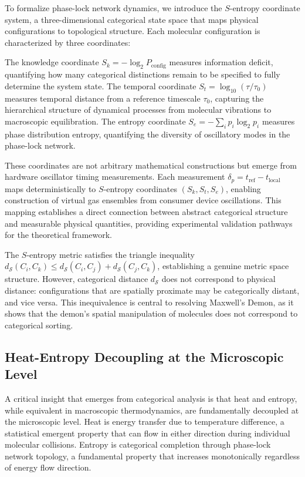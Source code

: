 \documentclass[12pt,a4paper]{article}
\theoremstyle{definition}
\theoremstyle{remark}
\begin{document}
To formalize phase-lock network dynamics, we introduce the $S$-entropy coordinate system, a three-dimensional categorical state space that maps physical configurations to topological structure. Each molecular configuration is characterized by three coordinates:

The knowledge coordinate $S_k = -\log_2 P_{\text{config}}$ measures information deficit, quantifying how many categorical distinctions remain to be specified to fully determine the system state. The temporal coordinate $S_t = \log_{10}(\tau/\tau_0)$ measures temporal distance from a reference timescale $\tau_0$, capturing the hierarchical structure of dynamical processes from molecular vibrations to macroscopic equilibration. The entropy coordinate $S_e = -\sum_i p_i \log_2 p_i$ measures phase distribution entropy, quantifying the diversity of oscillatory modes in the phase-lock network.

These coordinates are not arbitrary mathematical constructions but emerge from hardware oscillator timing measurements. Each measurement $\delta_p = t_{\text{ref}} - t_{\text{local}}$ maps deterministically to $S$-entropy coordinates $(S_k, S_t, S_e)$, enabling construction of virtual gas ensembles from consumer device oscillations. This mapping establishes a direct connection between abstract categorical structure and measurable physical quantities, providing experimental validation pathways for the theoretical framework.

The $S$-entropy metric satisfies the triangle inequality $d_{\mathcal{S}}(C_i, C_k) \leq d_{\mathcal{S}}(C_i, C_j) + d_{\mathcal{S}}(C_j, C_k)$, establishing a genuine metric space structure. However, categorical distance $d_{\mathcal{S}}$ does not correspond to physical distance: configurations that are spatially proximate may be categorically distant, and vice versa. This inequivalence is central to resolving Maxwell's Demon, as it shows that the demon's spatial manipulation of molecules does not correspond to categorical sorting.

\subsection{Heat-Entropy Decoupling at the Microscopic Level}

A critical insight that emerges from categorical analysis is that heat and entropy, while equivalent in macroscopic thermodynamics, are fundamentally decoupled at the microscopic level. Heat is energy transfer due to temperature difference, a statistical emergent property that can flow in either direction during individual molecular collisions. Entropy is categorical completion through phase-lock network topology, a fundamental property that increases monotonically regardless of energy flow direction.
\end{document}

